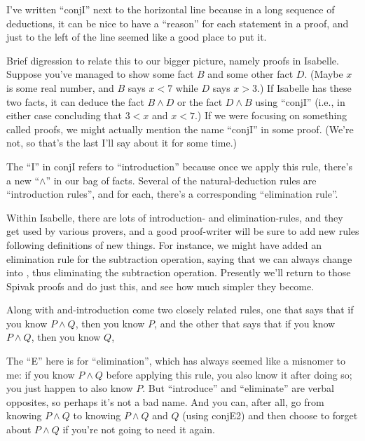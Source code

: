 \begin{prooftree}
\end{prooftree}

I've written ``conjI'' next to the horizontal line because in a long sequence of deductions, it can be nice to have a ``reason'' for each statement in a proof, and just to the left of the line seemed like a good place to put it. 

Brief digression to relate this to our bigger picture, namely proofs in Isabelle. Suppose you've managed to show some fact $B$ and some other fact $D$. (Maybe $x$ is some real number, and $B$ says $x < 7$ while $D$ says $x > 3$.) If Isabelle has these two facts, it can deduce the fact $B \wedge D$ or the fact $D \wedge B$ using ``conjI'' (i.e., in either case concluding that $3 < x$ and $x < 7$.) If we were focusing on something called  proofs, we might actually mention the name ``conjI'' in some proof. (We're not, so that's the last I'll say about it for some time.)

The ``I'' in conjI refers to ``introduction'' because once we apply this rule, there's a new ``$\wedge$'' in our bag of facts. Several of the natural-deduction rules are ``introduction rules'', and for each, there's a corresponding ``elimination rule''.

Within Isabelle, there are lots of introduction- and elimination-rules, and they get used by various provers, and a good proof-writer will be sure to add new rules following definitions of new things. For instance, we might have added an elimination rule for the subtraction operation, saying that we can always change  into , thus eliminating the subtraction operation. Presently we'll return to those Spivak proofs and do just this, and see how much simpler they become. 

Along with and-introduction come two closely related rules, one that says that if you know $P \wedge  Q$, then you know $P$, and the other that says that if you know $P \wedge  Q$, then you know $Q$,
\begin{prooftree}
\end{prooftree}

\begin{prooftree}
\end{prooftree}

The ``E'' here is for ``elimination'', which has always seemed like a misnomer to me: if you know $P \wedge  Q$ before applying this rule, you also know it after doing so; you just happen to also know $P$. But ``introduce'' and ``eliminate'' are verbal opposites, so perhaps it's not a bad name. And you can, after all, go from knowing $P \wedge Q$ to knowing $P \wedge Q$ and $Q$ (using conjE2) and then choose to forget about $P  \wedge  Q$ if you're not going to need it again. 


